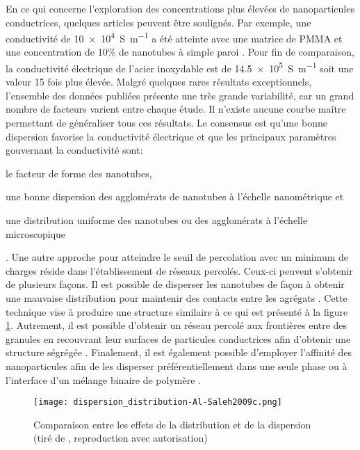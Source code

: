 \FloatBarrier
En ce qui concerne l'exploration des concentrations plus élevées de nanoparticules conductrices, quelques articles peuvent être soulignés. 
Par exemple, une conductivité de \SI[locale=FR]{10e4}{\siemens\per\metre} a été atteinte avec une matrice de PMMA et une concentration de 10\% de nanotubes à simple paroi \cite{Bauhofer2009}. 
Pour fin de comparaison, la conductivité électrique de l'acier inoxydable est de \SI[locale=FR]{14.5e5}{\siemens\per\metre} soit une valeur 15 fois plus élevée. 
Malgré quelques rares résultats exceptionnels, l'ensemble des données publiées présente une très grande variabilité, car un grand nombre de facteurs varient entre chaque étude.
Il n'existe aucune courbe maître permettant de généraliser tous ces résultats. 
Le consensus est qu'une bonne dispersion favorise la conductivité électrique \cite{Bauhofer2009} et que les principaux paramètres gouvernant la conductivité sont: 
\begin{inparaenum}
	\item le facteur de forme des nanotubes, 
	\item une bonne dispersion des agglomérats de nanotubes à l'échelle nanométrique et
	\item une distribution uniforme des nanotubes ou des agglomérats à l'échelle microscopique   
\end{inparaenum} \cite{Li2007a}.
Une autre approche pour atteindre le seuil de percolation avec un minimum de charges réside dans l'établissement de réseaux percolés. 
Ceux-ci peuvent s'obtenir de plusieurs façons. 
Il est possible de disperser les nanotubes de façon à obtenir une mauvaise distribution pour maintenir des contacts entre les agrégats \cite{Al-Saleh2009c,Deng2014a}. 
Cette technique vise à produire une structure similaire à ce qui est présenté à la figure \ref{fig:dispersion_distribution}. 
Autrement, il est possible d'obtenir un réseau percolé aux frontières entre des granules en recouvrant leur surfaces de particules conductrices afin d'obtenir une structure ségrégée \cite{Al-Saleh2011,Pang2014c}. 
Finalement, il est également possible d'employer l'affinité des nanoparticules afin de les disperser préférentiellement dans une seule phase ou à l'interface d'un mélange binaire de polymère \cite{Pang2014c,Deng2014a}. 

\begin{figure}[h]
	\centering
	\texttt{[image: dispersion\_distribution-Al-Saleh2009c.png]}
	\caption{Comparaison entre les effets de la distribution et de la dispersion (tiré de \cite{Al-Saleh2009c}, reproduction avec autorisation)}
	\label{fig:dispersion_distribution}
\end{figure}

